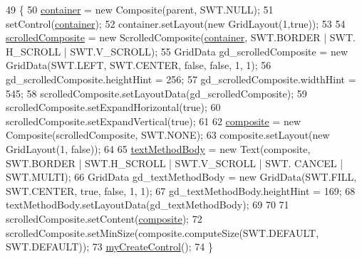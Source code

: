 \begin{DoxyCode}
49                                                 \{
50         \hyperlink{classit_1_1isislab_1_1masonhelperdocumentation_1_1mason_1_1wizards_1_1_l___step_method_page_af82020d1675719f61ee42e85d7fb9d83}{container} = \textcolor{keyword}{new} Composite(parent, SWT.NULL);
51         setControl(\hyperlink{classit_1_1isislab_1_1masonhelperdocumentation_1_1mason_1_1wizards_1_1_l___step_method_page_af82020d1675719f61ee42e85d7fb9d83}{container});
52         container.setLayout(\textcolor{keyword}{new} GridLayout(1,\textcolor{keyword}{true}));
53         
54         \hyperlink{classit_1_1isislab_1_1masonhelperdocumentation_1_1mason_1_1wizards_1_1_l___step_method_page_adf242c4fc6634f961d3c311e4d2d6e25}{scrolledComposite} = \textcolor{keyword}{new} ScrolledComposite(\hyperlink{classit_1_1isislab_1_1masonhelperdocumentation_1_1mason_1_1wizards_1_1_l___step_method_page_af82020d1675719f61ee42e85d7fb9d83}{container}, SWT.BORDER | SWT.
      H\_SCROLL | SWT.V\_SCROLL);
55         GridData gd\_scrolledComposite = \textcolor{keyword}{new} GridData(SWT.LEFT, SWT.CENTER, \textcolor{keyword}{false}, \textcolor{keyword}{false}, 1, 1);
56         gd\_scrolledComposite.heightHint = 256;
57         gd\_scrolledComposite.widthHint = 545;
58         scrolledComposite.setLayoutData(gd\_scrolledComposite);
59         scrolledComposite.setExpandHorizontal(\textcolor{keyword}{true});
60         scrolledComposite.setExpandVertical(\textcolor{keyword}{true});
61         
62         \hyperlink{classit_1_1isislab_1_1masonhelperdocumentation_1_1mason_1_1wizards_1_1_l___step_method_page_a73ff4ee05e8c5b36aed06fa604e32ac2}{composite} = \textcolor{keyword}{new} Composite(scrolledComposite, SWT.NONE);
63         composite.setLayout(\textcolor{keyword}{new} GridLayout(1, \textcolor{keyword}{false}));
64         
65         \hyperlink{classit_1_1isislab_1_1masonhelperdocumentation_1_1mason_1_1wizards_1_1_l___step_method_page_a8dc8dfbedd4fadf1c63f825645893362}{textMethodBody} = \textcolor{keyword}{new} Text(composite, SWT.BORDER | SWT.H\_SCROLL | SWT.V\_SCROLL | SWT.
      CANCEL | SWT.MULTI);
66         GridData gd\_textMethodBody = \textcolor{keyword}{new} GridData(SWT.FILL, SWT.CENTER, \textcolor{keyword}{true}, \textcolor{keyword}{false}, 1, 1);
67         gd\_textMethodBody.heightHint = 169;
68         textMethodBody.setLayoutData(gd\_textMethodBody);
69         
70     
71         scrolledComposite.setContent(\hyperlink{classit_1_1isislab_1_1masonhelperdocumentation_1_1mason_1_1wizards_1_1_l___step_method_page_a73ff4ee05e8c5b36aed06fa604e32ac2}{composite});
72         scrolledComposite.setMinSize(composite.computeSize(SWT.DEFAULT, SWT.DEFAULT));
73         \hyperlink{classit_1_1isislab_1_1masonhelperdocumentation_1_1mason_1_1wizards_1_1_l___step_method_page_aae5b5f889fca35447959d7f5f4f264a7}{myCreateControl}();
74     \}
\end{DoxyCode}


